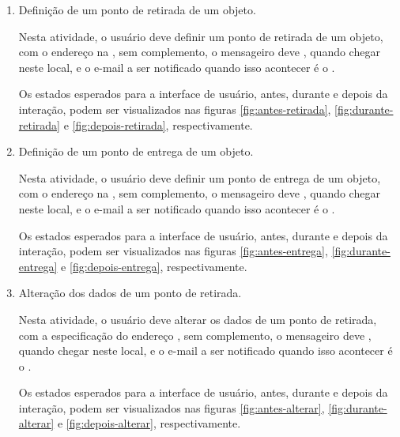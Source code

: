 \documentclass[
	article,
	11pt,
	oneside,
	a4paper,
	english,
	brazil,
	sumario=tradicional
]{abntex2}
\begin{document}
	\begin{enumerate}
		\item Definição de um ponto de retirada de um objeto.
		
		Nesta atividade, o usuário deve definir um ponto de retirada de um objeto, com o endereço na , sem complemento, o mensageiro deve , quando chegar neste local, e o e-mail a ser notificado quando isso acontecer é o .
		
		Os estados esperados para a interface de usuário, antes, durante e depois da interação, podem ser visualizados nas figuras \ref{fig:antes-retirada}, \ref{fig:durante-retirada} e \ref{fig:depois-retirada}, respectivamente.
		
		\item Definição de um ponto de entrega de um objeto.
		
		Nesta atividade, o usuário deve definir um ponto de entrega de um objeto, com o endereço na , sem complemento, o mensageiro deve , quando chegar neste local, e o e-mail a ser notificado quando isso acontecer é o .
		
		Os estados esperados para a interface de usuário, antes, durante e depois da interação, podem ser visualizados nas figuras \ref{fig:antes-entrega}, \ref{fig:durante-entrega} e \ref{fig:depois-entrega}, respectivamente.
		
		\item Alteração dos dados de um ponto de retirada.
		
		Nesta atividade, o usuário deve alterar os dados de um ponto de retirada, com a especificação do endereço , sem complemento, o mensageiro deve , quando chegar neste local, e o e-mail a ser notificado quando isso acontecer é o .
		
		Os estados esperados para a interface de usuário, antes, durante e depois da interação, podem ser visualizados nas figuras \ref{fig:antes-alterar}, \ref{fig:durante-alterar} e \ref{fig:depois-alterar}, respectivamente.
		
	\end{enumerate}
	
\end{document}
